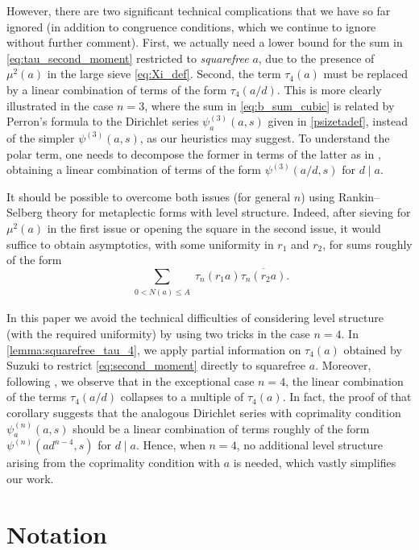\documentclass[12pt,reqno]{amsart}
\numberwithin{equation}{section}
\begin{document}
However, there are two significant technical complications that we have so far ignored (in addition to congruence conditions, which we continue to ignore without further comment). First, we actually need a lower bound for the sum in \eqref{eq:tau_second_moment} restricted to \emph{squarefree} $a$, due to the presence of $\mu^2(a)$ in the large sieve \eqref{eq:Xi_def}. Second, the term $\tau_4(a)$ must be replaced by a linear combination of terms of the form $\tau_4(a/d)$. This is more clearly illustrated in the case $n=3$, where the sum in \eqref{eq:b_sum_cubic} is related by Perron's formula to the Dirichlet series $\psi_a^{(3)}(a, s)$ given in \eqref{psizetadef}, instead of the simpler $\psi^{(3)}(a, s)$, as our heuristics may suggest. To understand the polar term, one needs to decompose the former in terms of the latter as in \cite[Corollary 6.2]{DDDS24}, obtaining a linear combination of terms of the form $\psi^{(3)}(a/d, s)$ for $d\mid a$.

It should be possible to overcome both issues (for general $n$) using Rankin--Selberg theory for metaplectic forms with level structure. Indeed, after sieving for $\mu^2(a)$ in the first issue or opening the square in the second issue, it would suffice to obtain asymptotics, with some uniformity in $r_1$ and $r_2$, for sums roughly of the form
\begin{equation*}
    \sum_{\substack{0 < N(a) \leq A}} \tau_n(r_1 a) \overline{\tau_n(r_2 a)}.
\end{equation*} 

In this paper we avoid the technical difficulties of considering level structure (with the required uniformity) by using two tricks in the case $n=4$. In \cref{lemma:squarefree_tau_4}, we apply partial information on $\tau_4(a)$ obtained by Suzuki \cite{Suz1} to restrict \eqref{eq:second_moment} directly to squarefree $a$. Moreover, following \cite[Corollary 6.2]{CDD26}, we observe that in the exceptional case $n=4$, the linear combination of the terms $\tau_4(a/d)$ collapses to a multiple of $\tau_4(a)$. In fact, the proof of that corollary suggests that the analogous Dirichlet series with coprimality condition $\psi_a^{(n)}(a, s)$ should be a linear combination of terms roughly of the form $\psi^{(n)}(a d^{n-4}, s)$ for $d \mid a$. 
Hence, when $n=4$, no additional level structure arising from the coprimality condition with $a$ is needed, which vastly simplifies our work.


\section{Notation}
\end{document}
